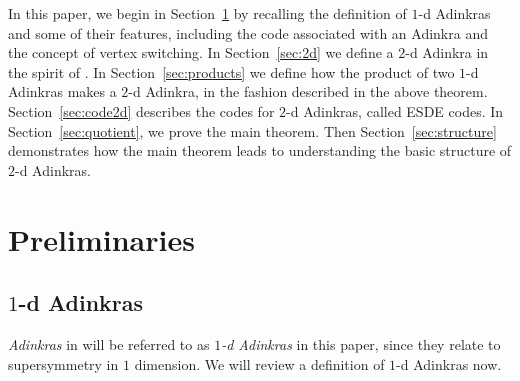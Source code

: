 \documentclass[12pt,twoside,singlespace]{article}
\numberwithin{equation}{section}
\theoremstyle{definition}
\begin{document}
In this paper, we begin in Section~\ref{sec:prelim} by recalling the definition of $1$-d Adinkras and some of their features, including the code associated with an Adinkra and the concept of vertex switching.  In Section~\ref{sec:2d} we define a $2$-d Adinkra in the spirit of \cite{gates:dimensional_extension,hubsch:weaving}.  In Section~\ref{sec:products} we define how the product of two $1$-d Adinkras makes a $2$-d Adinkra, in the fashion described in the above theorem.  Section~\ref{sec:code2d} describes the codes for $2$-d Adinkras, called ESDE codes.  In Section~\ref{sec:quotient}, we prove the main theorem.  Then Section~\ref{sec:structure} demonstrates how the main theorem leads to understanding the basic structure of $2$-d Adinkras.

\section{Preliminaries}
\label{sec:prelim}

\subsection{$1$-d Adinkras}
\label{sec:1d}
\emph{Adinkras} in \cite{d2l:first,d2l:graph-theoretic,zhang:adinkras} will be referred to as \emph{$1$-d Adinkras} in this paper, since they relate to supersymmetry in $1$ dimension.  We will review a definition of $1$-d Adinkras now.
\end{document}
